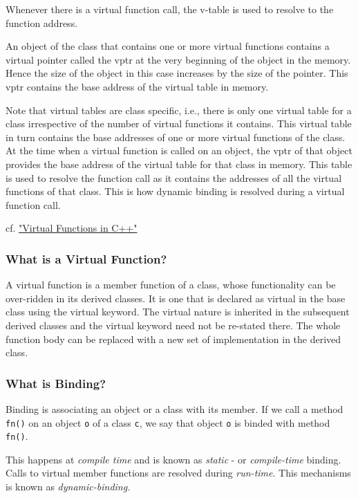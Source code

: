 \documentclass[10pt]{amsart}
\begin{document}
\begin{multicols*}{2}
Whenever there is a virtual function call, the v-table is used to resolve to the function address. 

An object of the class that contains one or more virtual functions contains a virtual pointer called the vptr at the very beginning of the object in the memory. Hence the size of the object in this case increases by the size of the pointer. This vptr contains the base address of the virtual table in memory.  

Note that virtual tables are class specific, i.e., there is only one virtual table for a class irrespective of the number of virtual functions it contains. This virtual table in turn contains the base addresses of one or more virtual functions of the class. At the time when a virtual function is called on an object, the vptr of that object provides the base address of the virtual table for that class in memory. This table is used to resolve the function call as it contains the addresses of all the virtual functions of that class. This is how dynamic binding is resolved during a virtual function call.

cf. \href{http://wayback.archive.org/web/20100209040010/http://www.codersource.net/published/view/325/virtual_functions_in.aspx}{"Virtual Functions in C++"}

\subsubsection{What is a Virtual Function?}  

A virtual function is a member function of a class, whose functionality can be over-ridden in its derived classes. It is one that is declared as virtual in the base class using the virtual keyword. The virtual nature is inherited in the subsequent derived classes and the virtual keyword need not be re-stated there. The whole function body can be replaced with a new set of implementation in the derived class. 

\subsubsection{What is Binding?}  

Binding is associating an object or a class with its member.   If we call a method \verb|fn()| on an object \verb|o| of a class \verb|c|, we say that object \verb|o| is binded with method \verb|fn()|.  

This happens at \emph{compile time} and is known as \emph{static} - or \emph{compile-time} binding.   
Calls to virtual member functions are resolved during \emph{run-time}.  This mechanisms is known as \emph{dynamic-binding.}   


\end{multicols*}
\end{document}
